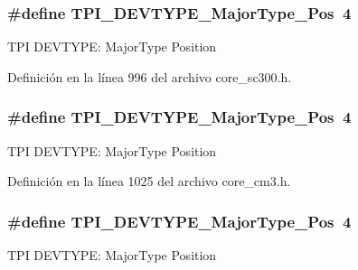 \subsubsection[{\texorpdfstring{T\+P\+I\+\_\+\+D\+E\+V\+T\+Y\+P\+E\+\_\+\+Major\+Type\+\_\+\+Pos}{TPI_DEVTYPE_MajorType_Pos}}]{\setlength{\rightskip}{0pt plus 5cm}\#define T\+P\+I\+\_\+\+D\+E\+V\+T\+Y\+P\+E\+\_\+\+Major\+Type\+\_\+\+Pos~4}\hypertarget{group___c_m_s_i_s___t_p_i_ga69c4892d332755a9f64c1680497cebdd}{}\label{group___c_m_s_i_s___t_p_i_ga69c4892d332755a9f64c1680497cebdd}
T\+PI D\+E\+V\+T\+Y\+PE\+: Major\+Type Position 

Definición en la línea 996 del archivo core\+\_\+sc300.\+h.

\subsubsection[{\texorpdfstring{T\+P\+I\+\_\+\+D\+E\+V\+T\+Y\+P\+E\+\_\+\+Major\+Type\+\_\+\+Pos}{TPI_DEVTYPE_MajorType_Pos}}]{\setlength{\rightskip}{0pt plus 5cm}\#define T\+P\+I\+\_\+\+D\+E\+V\+T\+Y\+P\+E\+\_\+\+Major\+Type\+\_\+\+Pos~4}\hypertarget{group___c_m_s_i_s___t_p_i_ga69c4892d332755a9f64c1680497cebdd}{}\label{group___c_m_s_i_s___t_p_i_ga69c4892d332755a9f64c1680497cebdd}
T\+PI D\+E\+V\+T\+Y\+PE\+: Major\+Type Position 

Definición en la línea 1025 del archivo core\+\_\+cm3.\+h.

\subsubsection[{\texorpdfstring{T\+P\+I\+\_\+\+D\+E\+V\+T\+Y\+P\+E\+\_\+\+Major\+Type\+\_\+\+Pos}{TPI_DEVTYPE_MajorType_Pos}}]{\setlength{\rightskip}{0pt plus 5cm}\#define T\+P\+I\+\_\+\+D\+E\+V\+T\+Y\+P\+E\+\_\+\+Major\+Type\+\_\+\+Pos~4}\hypertarget{group___c_m_s_i_s___t_p_i_ga69c4892d332755a9f64c1680497cebdd}{}\label{group___c_m_s_i_s___t_p_i_ga69c4892d332755a9f64c1680497cebdd}
T\+PI D\+E\+V\+T\+Y\+PE\+: Major\+Type Position 

